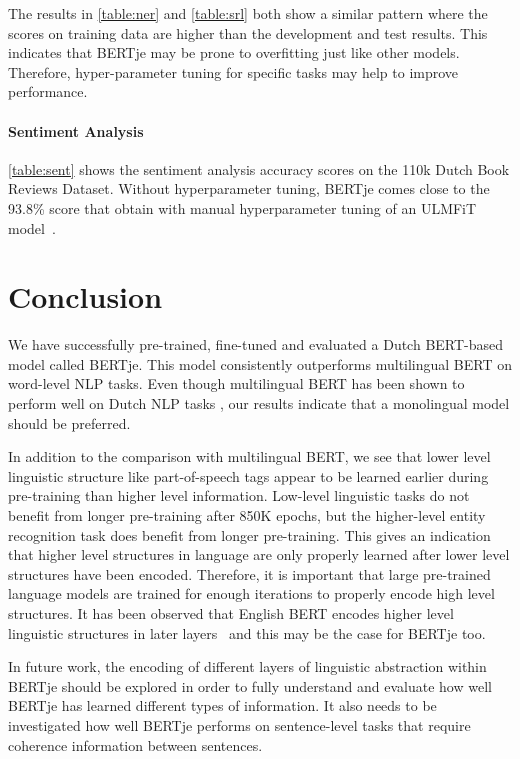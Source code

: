 \documentclass[11pt]{article}
\begin{document}
The results in \autoref{table:ner} and \autoref{table:srl} both show a similar pattern where the scores on training data are higher than the development and test results. This indicates that BERTje may be prone to overfitting just like other models. Therefore, hyper-parameter tuning for specific tasks may help to improve performance.

\paragraph{Sentiment Analysis}



\autoref{table:sent} shows the sentiment analysis accuracy scores on the 110k Dutch Book Reviews Dataset.
Without hyperparameter tuning, BERTje comes close to the 93.8\% score
that \citet{burgh2019merits} obtain with manual hyperparameter tuning of an ULMFiT model~\citep{Howard:2018}.


\section{Conclusion}
We have successfully pre-trained, fine-tuned and evaluated a Dutch BERT-based model called BERTje.
This model consistently outperforms multilingual BERT on word-level NLP tasks.
Even though multilingual BERT has been shown to perform well on Dutch NLP tasks \citep{wu2019surprising}, our results indicate that a monolingual model should be preferred.

In addition to the comparison with multilingual BERT, we see that lower level linguistic structure like part-of-speech tags appear to be learned earlier during pre-training than higher level information.
Low-level linguistic tasks do not benefit from longer pre-training after 850K epochs, but the higher-level entity recognition task does benefit from longer pre-training.
This gives an indication that higher level structures in language are only properly learned after lower level structures have been encoded.
Therefore, it is important that large pre-trained language models are trained for enough iterations to properly encode high level structures.
It has been observed that English BERT encodes higher level linguistic structures in later layers~\citep{jawahar2019does, tenney2019bert} and this may be the case for BERTje too.

In future work, the encoding of different layers of linguistic abstraction within BERTje should be explored in order to fully understand and evaluate how well BERTje has learned different types of information.
It also needs to be investigated how well BERTje performs on sentence-level tasks that require coherence information between sentences.
\end{document}
